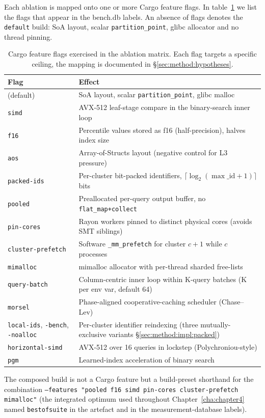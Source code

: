 Each ablation is mapped onto one or more Cargo feature flags. In table~\ref{tab:method:cargo} we list the flags that appear in the bench.db labels. An absence of flags denotes the \texttt{default} build: SoA layout, scalar \texttt{partition\_point}, glibc allocator and no thread pinning.

\begin{table}[H]
\centering
\caption[Cargo feature flags in the ablation matrix.]{Cargo feature flags exercised in the ablation matrix. Each flag targets a specific ceiling, the mapping is documented in §\ref{sec:method:hypotheses}.}
\label{tab:method:cargo}
\footnotesize
\begin{tabular}{l>{\raggedright\arraybackslash}p{8.2cm}}
\toprule
Flag & Effect \\
\midrule
(default)              & SoA layout, scalar \texttt{partition\_point}, glibc malloc \\
\texttt{simd}          & AVX-512 leaf-stage compare in the binary-search inner loop \\
\texttt{f16}           & Percentile values stored as f16 (half-precision), halves index size \\
\texttt{aos}           & Array-of-Structs layout (negative control for L3 pressure) \\
\texttt{packed-ids}    & Per-cluster bit-packed identifiers, $\lceil\log_2(\max\_\text{id}+1)\rceil$ bits \\
\texttt{pooled}        & Preallocated per-query output buffer, no \texttt{flat\_map+collect} \\
\texttt{pin-cores}     & Rayon workers pinned to distinct physical cores (avoids SMT siblings) \\
\texttt{cluster-prefetch} & Software \texttt{\_mm\_prefetch} for cluster $c{+}1$ while $c$ processes \\
\texttt{mimalloc}      & mimalloc allocator with per-thread sharded free-lists \\
\texttt{query-batch}   & Column-centric inner loop within K-query batches (K per env var, default 64) \\
\texttt{morsel}        & Phase-aligned cooperative-caching scheduler (Chase--Lev) \\
\texttt{local-ids}, \texttt{-bench}, \texttt{-noalloc} & Per-cluster identifier reindexing (three mutually-exclusive variants §\ref{sec:method:impl:packed}) \\
\texttt{horizontal-simd} & AVX-512 over 16 queries in lockstep (Polychroniou-style) \\
\texttt{pgm}           & Learned-index acceleration of binary search \\
\bottomrule
\end{tabular}

\vspace{0.5em}
\noindent The composed build \bcombo{} is not a Cargo feature but a build-preset shorthand for the combination \texttt{--features "pooled f16 simd pin-cores cluster-prefetch mimalloc"} (the integrated optimum used throughout Chapter~\ref{cha:chapter4} named \texttt{bestofsuite} in the artefact and in the measurement-database labels).
\end{table}

